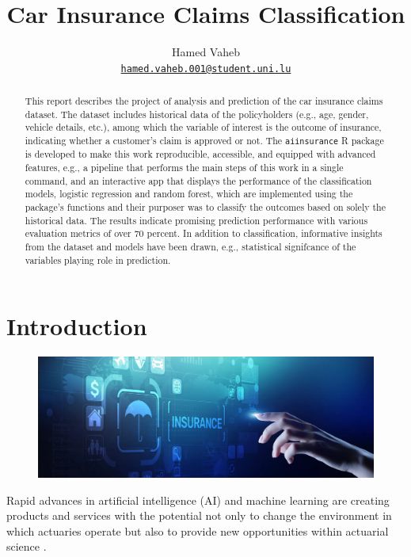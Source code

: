 \documentclass{article}
\title{\color{astral}Car Insurance Claims Classification}
\author{
    Hamed Vaheb\\
  \texttt{\href{mailto:hamed.vaheb.001@student.uni.lu}{\nolinkurl{hamed.vaheb.001@student.uni.lu}}}%
  }
\begin{document}
\maketitle


\begin{abstract}
This report describes the project of analysis and prediction of the car
insurance claims dataset. The dataset includes historical data of the
policyholders (e.g., age, gender, vehicle details, etc.), among which
the variable of interest is the outcome of insurance, indicating whether
a customer's claim is approved or not. The \texttt{aiinsurance} R
package \cite{package} is developed to make this work reproducible,
accessible, and equipped with advanced features, e.g., a pipeline that
performs the main steps of this work in a single command, and an
interactive app that displays the performance of the classification
models, logistic regression and random forest, which are implemented
using the package's functions and their purposer was to classify the
outcomes based on solely the historical data. The results indicate
promising prediction performance with various evaluation metrics of over
70 percent. In addition to classification, informative insights from the
dataset and models have been drawn, e.g., statistical signifcance of the
variables playing role in prediction.
\end{abstract}


\hypertarget{introduction}{%
\section{Introduction}\label{introduction}}

\begin{figure}
\includegraphics[width=0.9\linewidth]{./figures/aiactuary.png}
\end{figure}

Rapid advances in artificial intelligence (AI) and machine learning are
creating products and services with the potential not only to change the
environment in which actuaries operate but also to provide new
opportunities within actuarial science \cite{aiinins}.
\end{document}
